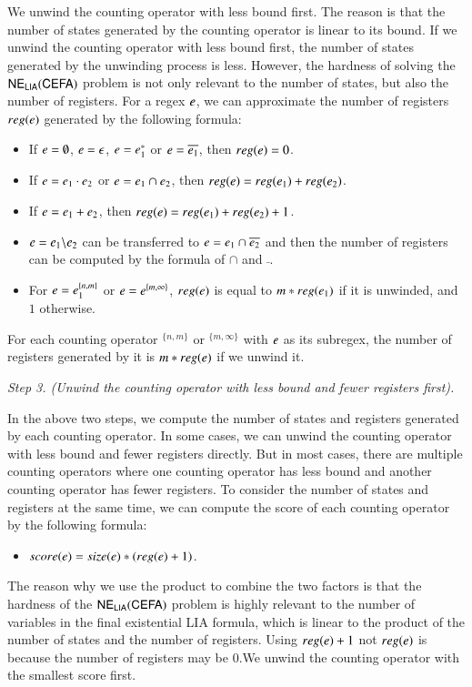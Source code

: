 {We unwind the counting operator with less bound first. The reason is that the number of states generated by the counting operator is linear to its bound. If we unwind the counting operator with less bound first, the number of states generated by the unwinding process is less. However, the hardness of solving the ${\sf NE_{LIA}(CEFA)}$ problem is not only relevant to the number of states, but also the number of registers. For a regex $e$, we can approximate the number of registers $reg(e)$ generated by the following formula:
\begin{itemize}
  \item If $e = \emptyset$, $e = \epsilon$, $e = e_1^*$ or $e = \overline{e_1}$, then $reg(e) = 0$.
  \item If $e = e_1\cdot e_2$ or $e = e_1 \cap e_2$, then $reg(e) = reg(e_1) + reg(e_2)$.
  \item If $e = e_1 + e_2$, then $reg(e) = reg(e_1) + reg(e_2) + 1$.
  \item $e = e_1 \backslash e_2$ can be transferred to $e = e_1 \cap \overline{e_2}$ and then the number of registers can be computed by the formula of $\cap$ and $\bar{}$.
  \item For $e = e_1^{\{n,m\}}$ or $e = e^{\{m, \infty\}}$, $reg(e)$ is equal to $m*reg(e_1)$ if it is unwinded, and $1$ otherwise.
\end{itemize}

For each counting operator $^{\{n,m\}}$ or $^{\{m,\infty\}}$ with $e$ as its subregex, the number of registers generated by it is $m*reg(e)$ if we unwind it.

\medskip
\noindent
\emph{Step 3. (Unwind the counting operator with less bound and fewer registers first).}

In the above two steps, we compute the number of states and registers generated by each counting operator. In some cases, we can unwind the counting operator with less bound and fewer registers directly. But in most cases, there are multiple counting operators where one counting operator has less bound and another counting operator has fewer registers. To consider the number of states and registers at the same time, we can compute the score of each counting operator by the following formula:
\begin{itemize}
  \item $score(e) = size(e) * (reg(e)+1)$.
\end{itemize} 
The reason why we use the product to combine the two factors is that the hardness of the ${\sf NE_{LIA}(CEFA)}$ problem is highly relevant to the number of variables in the final existential LIA formula, which is linear to the product of the number of states and the number of registers. Using $reg(e) + 1$ not $reg(e)$ is because the number of registers may be $0$.We unwind the counting operator with the smallest score first. 

}
